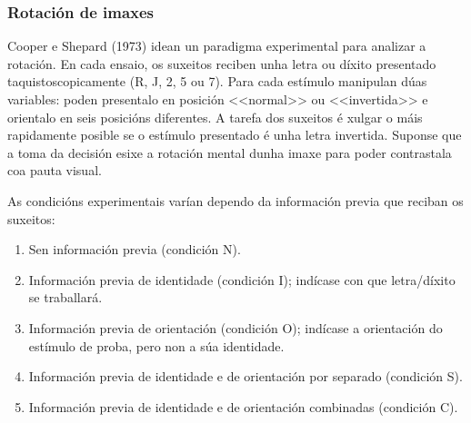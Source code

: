 \documentclass[a4paper,11pt]{article}
\begin{document}
\subsubsection{Rotación de imaxes}
Cooper e Shepard (1973) idean un paradigma experimental para analizar a rotación. En cada ensaio, os suxeitos reciben unha letra ou díxito presentado taquistoscopicamente (R, J, 2, 5 ou 7). Para cada estímulo manipulan dúas variables: poden presentalo en posición <<normal>> ou <<invertida>> e orientalo en seis posicións diferentes. A tarefa dos suxeitos é xulgar o máis rapidamente posible se o estímulo presentado é unha letra invertida. Suponse que a toma da decisión esixe a rotación mental dunha imaxe para poder contrastala coa pauta visual. 

As condicións experimentais varían dependo da información previa que reciban os suxeitos:
\begin{enumerate}
	\item Sen información previa (condición N).
	\item Información previa de identidade (condición I); indícase con que letra/díxito se 
	traballará.
	\item Información previa de orientación (condición O); indícase a orientación do estímulo de 
	proba, pero non a súa identidade.
	\item Información previa de identidade e de orientación por separado (condición S).
	\item Información previa de identidade e de orientación combinadas (condición C).
\end{enumerate}
\end{document}
